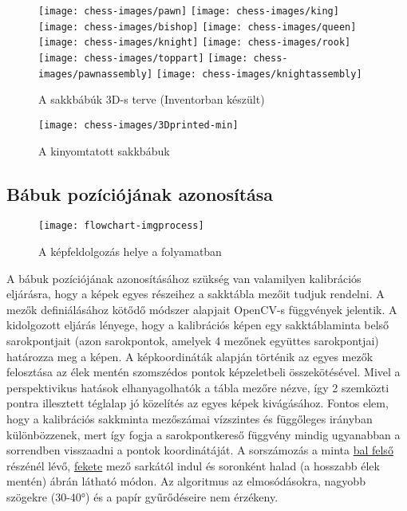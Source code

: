 \documentclass[../documentation.tex]{subfiles}
\begin{document}
\begin{figure}[h]
\centering
\texttt{[image: chess-images/pawn]}
\texttt{[image: chess-images/king]}
\texttt{[image: chess-images/bishop]}
\texttt{[image: chess-images/queen]}
\texttt{[image: chess-images/knight]}
\texttt{[image: chess-images/rook]}
\texttt{[image: chess-images/toppart]}
\texttt{[image: chess-images/pawnassembly]}
\texttt{[image: chess-images/knightassembly]}
\caption{A sakkbábúk 3D-s terve (Inventorban készült)}
\label{fig:chesspieces}
\end{figure}

\begin{figure}[h]
\centering
\texttt{[image: chess-images/3Dprinted-min]}
\caption{A kinyomtatott sakkbábuk}
\label{fig:3dprinted}
\end{figure}

\subsection{Bábuk pozíciójának azonosítása}

\begin{figure}[h]
\centering
\texttt{[image: flowchart-imgprocess]}
\caption{A képfeldolgozás helye a folyamatban}
\label{fig:flowchart-imgprocess}
\end{figure}

A bábuk pozíciójának azonosításához szükség van valamilyen kalibrációs eljárásra, hogy a képek egyes részeihez a sakktábla mezőit tudjuk rendelni. A mezők definiálásához kötődő módszer alapjait OpenCV-s függvények jelentik. A kidolgozott eljárás lényege, hogy a kalibrációs képen egy sakktáblaminta belső sarokpontjait (azon sarokpontok, amelyek 4 mezőnek együttes sarokpontjai) határozza meg a képen. A képkoordináták alapján történik az egyes mezők felosztása az élek mentén szomszédos pontok képzeletbeli összekötésével. Mivel a perspektivikus hatások elhanyagolhatók a tábla mezőre nézve, így 2 szemközti pontra illesztett téglalap jó közelítés az egyes képek kivágásához. Fontos elem, hogy a kalibrációs sakkminta mezőszámai vízszintes és függőleges irányban különbözzenek, mert így fogja a sarokpontkereső függvény mindig ugyanabban a sorrendben visszaadni a pontok koordinátáját. A sorszámozás a minta \underline{bal felső} részénél lévő, \underline{fekete} mező sarkától indul és soronként halad (a hosszabb élek mentén)  ábrán látható módon. Az algoritmus az elmosódásokra, nagyobb szögekre (30-40°) és a papír gyűrődéseire nem érzékeny.
\end{document}
